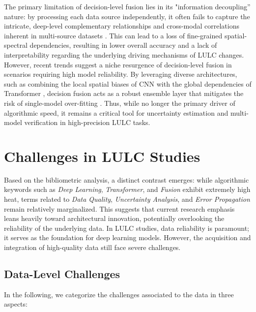 \documentclass[]{interact}
\theoremstyle{plain}%
\theoremstyle{definition}
\theoremstyle{remark}
\begin{document}
The primary limitation of decision-level fusion lies in its "information decoupling” nature: by processing each data source independently, it often fails to capture the intricate, deep-level complementary relationships and cross-modal correlations inherent in multi-source datasets \citep{6}. This can lead to a loss of fine-grained spatial-spectral dependencies, resulting in lower overall accuracy and a lack of interpretability regarding the underlying driving mechanisms of LULC changes. However, recent trends suggest a niche resurgence of decision-level fusion in scenarios requiring high model reliability. By leveraging diverse architectures, such as combining the local spatial biases of CNN with the global dependencies of Transformer \citep{bazi2021vision}, decision fusion acts as a robust ensemble layer that mitigates the risk of single-model over-fitting \citep{belgiu2016random}. Thus, while no longer the primary driver of algorithmic speed, it remains a critical tool for uncertainty estimation and multi-model verification in high-precision LULC tasks.



\section{Challenges in LULC Studies}
Based on the bibliometric analysis, a distinct contrast emerges: while algorithmic keywords such as \textit{Deep Learning}, \textit{Transformer}, and \textit{Fusion} exhibit extremely high heat, terms related to \textit{Data Quality}, \textit{Uncertainty Analysis}, and \textit{Error Propagation} remain relatively marginalized. This suggests that current research emphasis leans heavily toward architectural innovation, potentially overlooking the reliability of the underlying data. In LULC studies, data reliability is paramount; it serves as the foundation for deep learning models. However, the acquisition and integration of high-quality data still face severe challenges.

\subsection{Data-Level Challenges}

In the following, we categorize the challenges associated to the data in three aspects:
\end{document}
